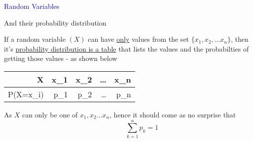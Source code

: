 \documentclass[14pt,fleqn]{extarticle}
\begin{document}
\begin{skill}
\textcolor{blue}{Random Variables} 

And their probability distribution
\end{skill}

%

\newcard

If a random variable $(X)$ can have \underline{only}
values from the set $\lbrace x_1, x_2, \ldots x_n\rbrace$, then 
it's \underline{probability distribution is a table}
that lists the values and the probabilties
of getting those values - as shown below

%
\begin{center}
\begin{tabular}{NNNNN}
\midrule
X & x_1 & x_2 & \ldots & x_n \\
\midrule 
P(X=x_i) & p_1 &p_2& \ldots & p_n \\
\midrule 
\end{tabular}
\end{center} 

As $X$ can only be one of $x_1, x_2 \ldots  x_n $, hence it should come as no surprise that \[ \qquad\qquad \sum_{k=1}^n p_k = 1 \] 
\end{document}
